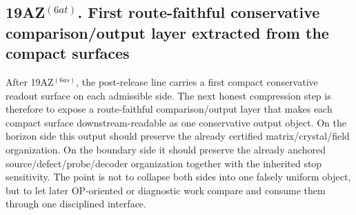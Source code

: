 \subsection*{19AZ$^{(6at)}$. First route-faithful conservative comparison/output layer extracted from the compact surfaces}
\label{sec:first-route-faithful-conservative-comparison-output-layer-extracted-from-the-compact-surfaces}
After 19AZ$^{(6as)}$, the post-release line carries a first compact conservative readout surface on each admissible side. The next honest compression step is therefore to expose a route-faithful comparison/output layer that makes each compact surface downstream-readable as one conservative output object. On the horizon side this output should preserve the already certified matrix/crystal/field organization. On the boundary side it should preserve the already anchored source/defect/probe/decoder organization together with the inherited stop sensitivity. The point is not to collapse both sides into one falsely uniform object, but to let later OP-oriented or diagnostic work compare and consume them through one disciplined interface.

